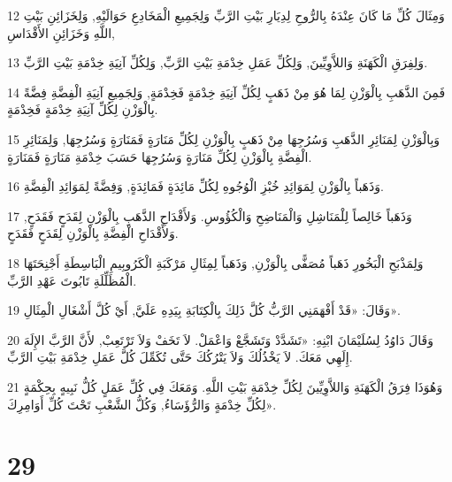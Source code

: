 \par 12 وَمِثَالَ كُلِّ مَا كَانَ عِنْدَهُ بِالرُّوحِ لِدِيَارِ بَيْتِ الرَّبِّ وَلِجَمِيعِ الْمَخَادِعِ حَوَالَيْهِ, وَلِخَزَائِنِ بَيْتِ اللَّهِ وَخَزَائِنِ الأَقْدَاسِ,
\par 13 وَلِفِرَقِ الْكَهَنَةِ وَاللاَّوِيِّينَ, وَلِكُلِّ عَمَلِ خِدْمَةِ بَيْتِ الرَّبِّ, وَلِكُلِّ آنِيَةِ خِدْمَةِ بَيْتِ الرَّبِّ.
\par 14 فَمِنَ الذَّهَبِ بِالْوَزْنِ لِمَا هُوَ مِنْ ذَهَبٍ لِكُلِّ آنِيَةِ خِدْمَةٍ فَخِدْمَةٍ, وَلِجَمِيعِ آنِيَةِ الْفِضَّةِ فِضَّةً بِالْوَزْنِ لِكُلِّ آنِيَةِ خِدْمَةٍ فَخِدْمَةٍ.
\par 15 وَبِالْوَزْنِ لِمَنَائِرِ الذَّهَبِ وَسُرُجِهَا مِنْ ذَهَبٍ بِالْوَزْنِ لِكُلِّ مَنَارَةٍ فَمَنَارَةٍ وَسُرُجِهَا, وَلِمَنَائِرِ الْفِضَّةِ بِالْوَزْنِ لِكُلِّ مَنَارَةٍ وَسُرُجِهَا حَسَبَ خِدْمَةِ مَنَارَةٍ فَمَنَارَةٍ.
\par 16 وَذَهَباً بِالْوَزْنِ لِمَوَائِدِ خُبْزِ الْوُجُوهِ لِكُلِّ مَائِدَةٍ فَمَائِدَةٍ, وَفِضَّةً لِمَوَائِدِ الْفِضَّةِ.
\par 17 وَذَهَباً خَالِصاً لِلْمَنَاشِلِ وَالْمَنَاضِحِ وَالْكُؤُوسِ. وَلأَقْدَاحِ الذَّهَبِ بِالْوَزْنِ لِقَدَحٍ فَقَدَحٍ, وَلأَقْدَاحِ الْفِضَّةِ بِالْوَزْنِ لِقَدَحٍ فَقَدَحٍ.
\par 18 وَلِمَذْبَحِ الْبَخُورِ ذَهَباً مُصَفًّى بِالْوَزْنِ, وَذَهَباً لِمِثَالِ مَرْكَبَةِ الْكَرُوبِيمِ الْبَاسِطَةِ أَجْنِحَتَهَا الْمُظَلِّلَةِ تَابُوتَ عَهْدِ الرَّبِّ.
\par 19 وَقَالَ: «قَدْ أَفْهَمَنِي الرَّبُّ كُلَّ ذَلِكَ بِالْكِتَابَةِ بِيَدِهِ عَلَيَّ, أَيْ كُلَّ أَشْغَالِ الْمِثَالِ».
\par 20 وَقَالَ دَاوُدُ لِسُلَيْمَانَ ابْنِهِ: «تَشَدَّدْ وَتَشَجَّعْ وَاعْمَلْ. لاَ تَخَفْ وَلاَ تَرْتَعِبْ, لأَنَّ الرَّبَّ الإِلَهَ إِلَهِي مَعَكَ. لاَ يَخْذُلُكَ وَلاَ يَتْرُكُكَ حَتَّى تُكَمِّلَ كُلَّ عَمَلِ خِدْمَةِ بَيْتِ الرَّبِّ.
\par 21 وَهُوَذَا فِرَقُ الْكَهَنَةِ وَاللاَّوِيِّينَ لِكُلِّ خِدْمَةِ بَيْتِ اللَّهِ. وَمَعَكَ فِي كُلِّ عَمَلٍ كُلُّ نَبِيهٍ بِحِكْمَةٍ لِكُلِّ خِدْمَةٍ وَالرُّؤَسَاءُ, وَكُلُّ الشَّعْبِ تَحْتَ كُلِّ أَوَامِرِكَ».

\chapter{29}

